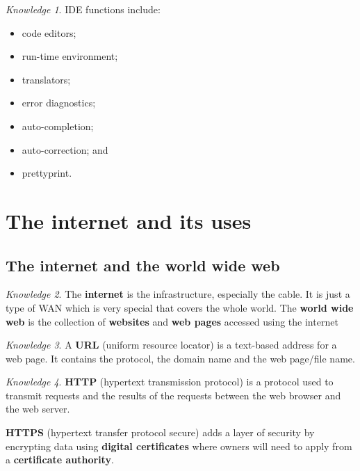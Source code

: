 \documentclass[8pt]{article}
\theoremstyle{remark}
\newtheorem{knowledge}{Knowledge}[subsection]
\begin{document}
            \begin{knowledge}
                IDE functions include:
                \begin{itemize}
                    \item code editors;
                    \item run-time environment;
                    \item translators;
                    \item error diagnostics;
                    \item auto-completion;
                    \item auto-correction; and
                    \item prettyprint.
                \end{itemize}
            \end{knowledge}

    \section{The internet and its uses}
        
        \subsection{The internet and the world wide web}

            \begin{knowledge}
                The \textbf{internet} is the infrastructure, especially the cable. It is just a type of WAN which is very special that covers the whole world. The \textbf{world wide web} is the collection of \textbf{websites} and \textbf{web pages} accessed using the internet
            \end{knowledge}

            \begin{knowledge}
                A \textbf{URL} (uniform resource locator) is a text-based address for a web page. It contains the protocol, the domain name and the web page/file name.
            \end{knowledge}

            \begin{knowledge}
                \textbf{HTTP} (hypertext transmission protocol) is a protocol used to transmit requests and the results of the requests between the web browser and the web server.
                
                \textbf{HTTPS} (hypertext transfer protocol secure) adds a layer of security by encrypting data using \textbf{digital certificates} where owners will need to apply from a \textbf{certificate authority}.
            \end{knowledge}
\end{document}
